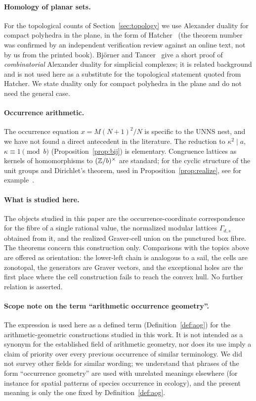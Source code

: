 \paragraph{Homology of planar sets.}
For the topological counts of Section~\ref{sec:topology} we use Alexander duality for compact polyhedra in the plane, in the form of Hatcher~\cite[Theorem~3.44, \S3.3]{Hatcher2002} (the theorem number was confirmed by an independent verification review against an online text, not by us from the printed book). Bj\"orner and Tancer~\cite{BjornerTancer2009} give a short proof of \emph{combinatorial} Alexander duality for simplicial complexes; it is related background and is not used here as a substitute for the topological statement quoted from Hatcher. We state duality only for compact polyhedra in the plane and do not need the general case.

\paragraph{Occurrence arithmetic.}
The occurrence equation $x=M(N+1)^2/N$ is specific to the UNNS nest, and we have not found a direct antecedent in the literature. The reduction to $\kappa^2\mid a$, $\kappa\equiv1\pmod b$ (Proposition~\ref{prop:bij}) is elementary. Congruence lattices as kernels of homomorphisms to $(\mathbb Z/b)^\times$ are standard; for the cyclic structure of the unit groups and Dirichlet's theorem, used in Proposition~\ref{prop:realize}, see for example~\cite{Serre1973}.

\paragraph{What is studied here.}
The objects studied in this paper are the occurrence-coordinate correspondence for the fibre of a single rational value, the normalized modular lattices $\Gamma_{d,s}$ obtained from it, and the realized Graver-cell union on the punctured box fibre. The theorems concern this construction only. Comparisons with the topics above are offered as orientation: the lower-left chain is analogous to a sail, the cells are zonotopal, the generators are Graver vectors, and the exceptional holes are the first place where the cell construction fails to reach the convex hull. No further relation is asserted.

\paragraph{Scope note on the term ``arithmetic occurrence geometry''.}
The expression is used here as a defined term (Definition~\ref{def:aog}) for the arithmetic-geometric constructions studied in this work. It is not intended as a synonym for the established field of arithmetic geometry, nor does its use imply a claim of priority over every previous occurrence of similar terminology. We did not survey other fields for similar wording; we understand that phrases of the form ``occurrence geometry'' are used with unrelated meanings elsewhere (for instance for spatial patterns of species occurrence in ecology), and the present meaning is only the one fixed by Definition~\ref{def:aog}.

